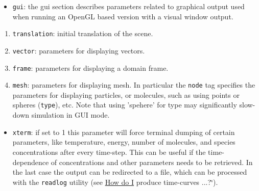 \begin{itemize}
\item {\tt gui}: the gui section describes parameters related to graphical output used when running an OpenGL based version with a visual window output.\end{itemize}
\begin{enumerate}
\item {\tt translation}: initial translation of the scene.\item {\tt vector}: parameters for displaying vectors.\item {\tt frame}: parameters for displaying a domain frame.\item {\tt mesh}: parameters for displaying mesh. In particular the {\tt node} tag specifies the parameters for displaying particles, or molecules, such as using points or spheres ({\tt type}), etc. Note that using 'spehere' for type may significantly slow-down simulation in GUI mode.\end{enumerate}


\begin{itemize}
\item {\tt xterm}: if set to 1 this parameter will force terminal dumping of certain parameters, like temperature, energy, number of molecules, and species concentrations after every time-step. This can be useful if the time-dependence of concentrations and other parameters needs to be retrieved. In the last case the output can be redirected to a file, which can be processed with the {\tt readlog} utility (see \hyperlink{FAQ_SecFAQ}{How do I} produce time-curves ...?\char`\"{}). \end{itemize}
